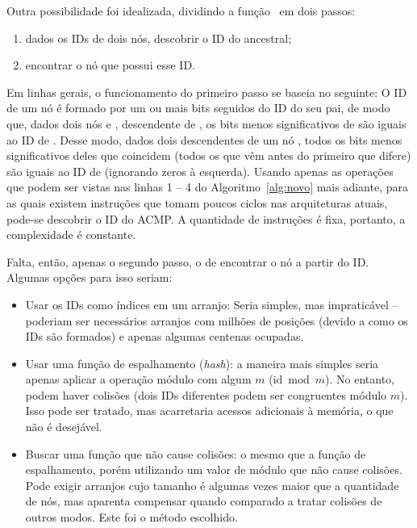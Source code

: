 Outra possibilidade foi idealizada, dividindo a função \ACMPIDs\ em dois passos:
\begin{enumerate}
	\item dados os IDs de dois nós, descobrir o ID do ancestral;
	\item encontrar o nó que possui esse ID.
\end{enumerate}
Em linhas gerais, o funcionamento do primeiro passo se baseia no seguinte:
O ID de um nó é formado por um ou mais bits seguidos do ID do seu pai, de modo que, dados dois nós  e ,  descendente de ,
os bits menos significativos de  são iguais ao ID de .
Desse modo, dados dois descendentes de um nó , todos os bits menos significativos deles que coincidem
(todos os que vêm antes do primeiro que difere) são iguais ao ID de  (ignorando zeros à esquerda).
Usando apenas as operações que podem ser vistas nas linhas 1 -- 4 do Algoritmo~\ref{alg:novo} mais adiante,
para as quais existem instruções que tomam poucos ciclos nas arquiteturas atuais, pode-se descobrir o ID do ACMP.
A quantidade de instruções é fixa, portanto, a complexidade é constante.




Falta, então, apenas o segundo passo, o de encontrar o nó a partir do ID.
Algumas opções para isso seriam:
\begin{itemize}
	\item Usar os IDs como índices em um arranjo: Seria simples, mas impraticável -- poderiam ser necessários arranjos com milhões de posições (devido a como os IDs são formados) e apenas algumas centenas ocupadas.
	\item Usar uma função de espalhamento (\textit{hash}): a maneira mais simples seria apenas aplicar a operação módulo com algum $m$ ($\mathrm{id} \bmod m$).
	No entanto, podem haver colisões (dois IDs diferentes podem ser congruentes módulo $m$).
	Isso pode ser tratado, mas acarretaria acessos adicionais à memória, o que não é desejável.
	\item Buscar uma função que não cause colisões: o mesmo que a função de espalhamento, porém utilizando um valor de módulo que não cause colisões.
	Pode exigir arranjos cujo tamanho é algumas vezes maior que a quantidade de nós, mas aparenta compensar quando comparado a tratar colisões de outros modos.
	Este foi o método escolhido.
\end{itemize}

